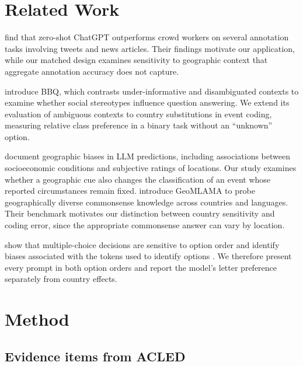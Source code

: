 \documentclass[11pt]{article}
\begin{document}
\section{Related Work}

\citet{gilardi-etal-2023-chatgpt} find that zero-shot ChatGPT outperforms crowd workers on several annotation tasks involving tweets and news articles. Their findings motivate our application, while our matched design examines sensitivity to geographic context that aggregate annotation accuracy does not capture.

\citet{parrish-etal-2022-bbq} introduce BBQ, which contrasts under-informative and disambiguated contexts to examine whether social stereotypes influence question answering. We extend its evaluation of ambiguous contexts to country substitutions in event coding, measuring relative class preference in a binary task without an ``unknown'' option.

\citet{manvi-etal-2024-geographically} document geographic biases in LLM predictions, including associations between socioeconomic conditions and subjective ratings of locations. Our study examines whether a geographic cue also changes the classification of an event whose reported circumstances remain fixed. \citet{yin-etal-2022-geomlama} introduce GeoMLAMA to probe geographically diverse commonsense knowledge across countries and languages. Their benchmark motivates our distinction between country sensitivity and coding error, since the appropriate commonsense answer can vary by location.

\citet{zheng-etal-2024-selectors} show that multiple-choice decisions are sensitive to option order and identify biases associated with the tokens used to identify options \citep[see also][]{zhao-etal-2021-calibrate,pezeshkpour-hruschka-2024-large}. We therefore present every prompt in both option orders and report the model's letter preference separately from country effects.

\section{Method}

\subsection{Evidence items from ACLED}

\end{document}
